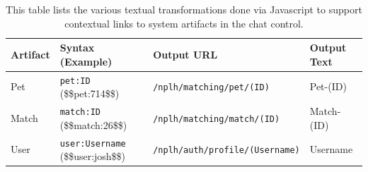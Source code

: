 \begin{table}[htb]
		\caption[Translations performed client-side by {\tt chat} subsystem] {
		This table lists the various textual transformations done via Javascript to support contextual links to system artifacts in the chat control.
		}
		\begin{center}
		\begin{tabularx}{\textwidth}{| l | p{3cm} | X | l |}
		\hline
		Artifact & Syntax (Example) & Output URL & Output Text \\ \hline \hline
		Pet & {\tt pet:ID} \newline (\$\$pet:714\$\$) & {\tt /nplh/matching/pet/(ID)} & Pet-(ID) \\ \hline
		Match & {\tt match:ID} \newline (\$\$match:26\$\$) & {\tt /nplh/matching/match/(ID)} & Match-(ID) \\ \hline
		User & {\tt user:Username} \newline (\$\$user:josh\$\$) & {\tt /nplh/auth/profile/(Username)} & Username \\ \hline
		\end{tabularx}
		\\ \rule{0mm}{5mm}
		\end{center}
		\label{table:translation}
\end{table}

